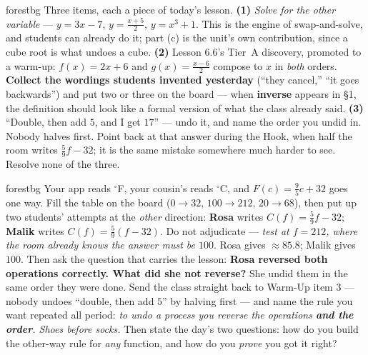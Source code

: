 \documentclass[10pt]{article}
\begin{document}
\begin{fixedskillbox}{forestbg}
    Three items, each a piece of today's lesson. \textbf{(1)} \emph{Solve for the other variable}
    --- $y=3x-7$, $y=\frac{x+5}{2}$, $y=x^{3}+1$. This is the engine of swap-and-solve, and students
    can already do it; part (c) is the unit's own contribution, since a cube root is what undoes a
    cube. \textbf{(2)} Lesson 6.6's Tier~A discovery, promoted to a warm-up: $f(x)=2x+6$ and
    $g(x)=\frac{x-6}{2}$ compose to $x$ in \emph{both} orders. \textbf{Collect the wordings students
    invented yesterday} (``they cancel,'' ``it goes backwards'') and put two or three on the board
    --- when \textbf{inverse} appears in \S1, the definition should look like a formal version of
    what the class already said. \textbf{(3)} ``Double, then add $5$, and I get $17$'' --- undo it,
    and name the order you undid in. Nobody halves first. Point back at that answer during the Hook,
    when half the room writes $\frac59f-32$; it is the same mistake somewhere much harder to see.
    Resolve none of the three.
\end{fixedskillbox}

\begin{skillbox}[Hook]{forestbg}
    Your app reads $^\circ$F, your cousin's reads $^\circ$C, and $F(c)=\frac95c+32$ goes one way.
    Fill the table on the board ($0\to32$, $100\to212$, $20\to68$), then put up two students' attempts
    at the \emph{other} direction: \textbf{Rosa} writes $C(f)=\frac59f-32$; \textbf{Malik} writes
    $C(f)=\frac59(f-32)$. Do not adjudicate --- \emph{test at $f=212$, where the room already knows
    the answer must be $100$}. Rosa gives $\approx85.8$; Malik gives $100$. Then ask the question
    that carries the lesson: \textbf{Rosa reversed both operations correctly. What did she not
    reverse?} She undid them in the same order they were done. Send the class straight back to
    Warm-Up item 3 --- nobody undoes ``double, then add $5$'' by halving first --- and name the rule
    you want repeated all period: \emph{to undo a process you reverse the operations \textbf{and the
    order}. Shoes before socks.} Then state the day's two questions: how do you build the other-way
    rule for \emph{any} function, and how do you \emph{prove} you got it right?
\end{skillbox}
\end{document}
